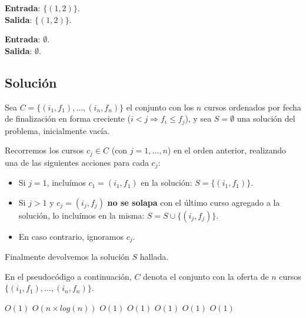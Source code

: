 \documentclass[a4paper, 10pt, twoside]{article}
\newenvironment{pseudo}[1][]{%
    \vspace{0.5em}%
    \begin{algorithmic}%
}
{%
    \end{algorithmic}%
    \vspace{0.5em}%
}
\newcommand{\To}{\textbf{to} }
\newcommand{\Ode}[1]{\hfill $O(#1)$}
\begin{document}
\textbf{Entrada}: $\{(1, 2)\}$.\\
\textbf{Salida}: $\{(1, 2)\}$.

\textbf{Entrada}: $\emptyset$.\\
\textbf{Salida}: $\emptyset$.


\subsection{Solución}

Sea $C = \{ (i_1, f_1), \ldots, (i_n, f_n) \}$ el conjunto con los $n$ cursos ordenados por fecha de finalización en forma creciente ($i < j \Rightarrow f_i \leq f_j$), y sea $S = \emptyset$ una solución del problema, inicialmente vacía.

Recorremos los cursos $c_j \in C$ (con $j = 1, \ldots, n$) en el orden anterior, realizando una de las siguientes acciones para cada $c_j$:

\begin{itemize}
    \item{
        Si $j = 1$, incluímos $c_1 = (i_1, f_1)$ en la solución: $S = \{ (i_1, f_1) \}$.
    }
    \item{
        Si $j > 1$ y $c_j = (i_j, f_j)$ \textbf{no se solapa} con el último curso agregado a la solución, lo incluímos en la misma: $S = S \cup \{ (i_j, f_j) \}$.
    }
    \item{
        En caso contrario, ignoramos $c_j$.
    }
\end{itemize}

Finalmente devolvemos la solución $S$ hallada.

En el pseudocódigo a continuación, $C$ denota el conjunto con la oferta de $n$ cursos $\{ (i_1, f_1), \ldots, (i_n, f_n) \}$.

\begin{pseudo}
                                            \Ode{1}
        \Else
                                     \Ode{n \times log(n)}
                                    \Ode{1}
                                                 \Ode{1}
            \For{$j = 2$ \To $|C|$}                            
                                                \Ode{1}
                           \Ode{1}
                                                 \Ode{1}
                \EndIf
            \EndFor
        \EndIf
    \EndProcedure 
\end{pseudo}
\end{document}
